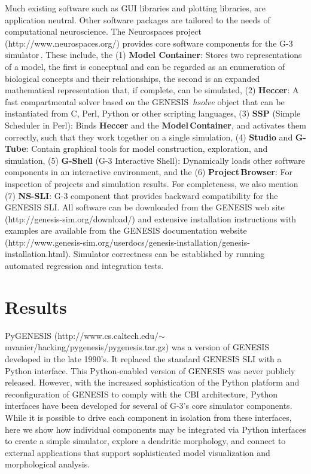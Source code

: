 \documentclass[10pt]{article}
\begin{document}
Much existing software such as GUI libraries and plotting libraries,
are application neutral.  Other software packages are tailored to the
needs of computational neuroscience.  The Neurospaces project
(http://www.neurospaces.org/) provides core software components for the
G-3 simulator\,\cite{cornelis03:_neuros}. These include, the (1) {\bf
  Model Container}: Stores two representations of a model, the first
is conceptual and can be regarded as an enumeration of biological
concepts and their relationships, the second is an expanded
mathematical representation that, if complete, can be simulated, (2)
{\bf Heccer}: A fast compartmental solver based on the GENESIS\,{\it
  hsolve} object that can be instantiated from C, Perl, Python or
other scripting languages, (3) {\bf SSP} (Simple Scheduler in Perl):
Binds {\bf Heccer} and the {\bf Model\,Container}, and activates them
correctly, such that they work together on a single simulation, (4)
{\bf Studio} and {\bf G-Tube}: Contain graphical tools for model
construction, exploration, and simulation, (5) {\bf G-Shell} (G-3
Interactive Shell): Dynamically loads other software components in an
interactive environment, and the (6) {\bf Project\,Browser}: For
inspection of projects and simulation results. For completeness, we
also mention (7) {\bf NS-SLI}: G-3 component that provides
backward compatibility for the GENESIS SLI. All software can be
downloaded from the GENESIS web site
(http://genesis-sim.org/download/) and extensive installation
instructions with examples are available from the GENESIS
documentation website
(http://www.genesis-sim.org/userdocs/genesis-installation/genesis-installation.html).
Simulator correctness can be established by running automated
regression and integration tests.



\section*{Results}

PyGENESIS
(http://www.cs.caltech.edu/$\sim$mvanier/hacking/pygenesis/pygenesis.tar.gz)
was a version of GENESIS developed in the late 1990's. It replaced the
standard GENESIS SLI with a Python interface. This Python-enabled
version of GENESIS was never publicly released.  However, with the
increased sophistication of the Python platform and reconfiguration of
GENESIS to comply with the CBI architecture, Python interfaces have
been developed for several of G-3's core simulator components.  While
it is possible to drive each component in isolation from these
interfaces, here we show how individual components may be integrated
via Python interfaces to create a simple simulator, explore a
dendritic morphology, and connect to external applications that
support sophisticated model visualization and morphological analysis.
\end{document}
